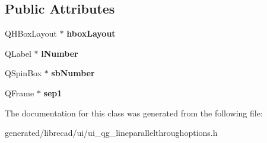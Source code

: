 \subsection*{Public Attributes}
\begin{DoxyCompactItemize}
\item 
\hypertarget{classUi__QG__LineParallelThroughOptions_a626a61e9fcfd62ce8af04a99200762e0}{Q\-H\-Box\-Layout $\ast$ {\bfseries hbox\-Layout}}\label{classUi__QG__LineParallelThroughOptions_a626a61e9fcfd62ce8af04a99200762e0}

\item 
\hypertarget{classUi__QG__LineParallelThroughOptions_a4c7172450e65de07c88429e11ecc5867}{Q\-Label $\ast$ {\bfseries l\-Number}}\label{classUi__QG__LineParallelThroughOptions_a4c7172450e65de07c88429e11ecc5867}

\item 
\hypertarget{classUi__QG__LineParallelThroughOptions_a65401778411ec59488be0ec0cfcf1ecf}{Q\-Spin\-Box $\ast$ {\bfseries sb\-Number}}\label{classUi__QG__LineParallelThroughOptions_a65401778411ec59488be0ec0cfcf1ecf}

\item 
\hypertarget{classUi__QG__LineParallelThroughOptions_a8e88bf5a36d1117fa0e839c4ec978067}{Q\-Frame $\ast$ {\bfseries sep1}}\label{classUi__QG__LineParallelThroughOptions_a8e88bf5a36d1117fa0e839c4ec978067}

\end{DoxyCompactItemize}


The documentation for this class was generated from the following file\-:\begin{DoxyCompactItemize}
\item 
generated/librecad/ui/ui\-\_\-qg\-\_\-lineparallelthroughoptions.\-h\end{DoxyCompactItemize}
